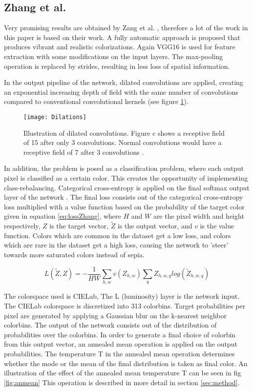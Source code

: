\subsection{Zhang et al.}
Very promising results are obtained by Zang et al. \cite{Zhang}, therefore a lot of the work in this paper is based on their work.
A fully automatic approach is proposed that produces vibrant and realistic colorizations. Again VGG16 is used for feature extraction with some modifications on the input layers. The max-pooling operation is replaced by strides, resulting in less loss of spatial information. 

In the output pipeline of the network, dilated convolutions \cite{yu2015multi} are applied, creating an exponential increasing depth of field with the same number of convolutions compared to conventional convolutional kernels (see figure \ref{fig:dilations}).

\begin{figure}[h]
	\centering
	\texttt{[image: Dilations]}
	\caption{Illustration of dilated convolutions. Figure c shows a receptive field of 15 after only 3 convolutions. Normal convolutions would have a receptive field of 7 after 3 convolutions \cite{yu2015multi}.}
	\label{fig:dilations}
\end{figure}

In addition, the problem is posed as a classification problem, where each output pixel is classified as a certain color. This creates the opportunity of implementing class-rebalancing.
Categorical cross-entropy is applied on the final softmax output layer of the network \cite{de2005tutorial}. The final loss consists out of the categorical cross-entropy loss multiplied with a value function based on the probability of the target color given in equation \ref{eq:lossZhang}, where $H$ and $W$ are the pixel width and height respectively, $Z$ is the target vector, $\widetilde{Z}$ is the output vector, and $v$ is the value function.
Colors which are common in the dataset get a low loss, and colors which are rare in the dataset get a high loss, causing the network to 'steer' towards more saturated colors instead of sepia. 

\begin{equation}
L(\widetilde{Z},Z)=-\frac{1}{HW}\sum_{h,w}v(Z_{h,w})\sum_q^{}{Z_{h,w,q}log({\widetilde{Z}_{h,w,q}})}
\label{eq:lossZhang}
\end{equation}

The colorspace used is CIELab, The L (luminosity) layer is the network input. The CIELab colorspace is discretized into 313 colorbins. Target probabilities per pixel are generated by applying a Gaussian blur on the k-nearest neighbor colorbins. The output of the network consists out of the distribution of probabilities over the colorbins. In order to generate a final choice of colorbin from this output vector, an annealed mean operation is applied on the output probabilities. The temperature T in the annealed mean operation determines whether the mode or the mean of the final distribution is taken as final color. An illustration of the effect of the annealed mean temperature T can be seen in fig \ref{fig:anmean} This operation is described in more detail in section \ref{sec:method}.

